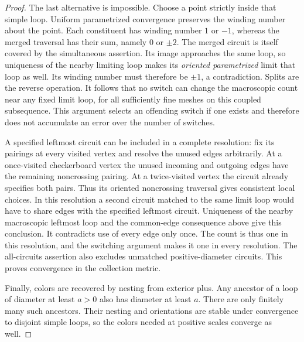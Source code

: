 \begin{proof}
The last alternative is impossible.  Choose a point strictly inside
that simple loop.  Uniform parametrized convergence preserves the
winding number about the point.  Each constituent has winding number
$1$ or $-1$, whereas the merged traversal has their sum, namely $0$ or
$\pm2$. The merged circuit is itself covered by the simultaneous
assertion. Its image approaches the same loop, so uniqueness of the
nearby limiting loop makes its \emph{oriented parametrized} limit that
loop as well. Its winding number must therefore be $\pm1$, a
contradiction. Splits
are the reverse operation.  It follows that no switch can change the
macroscopic count near any fixed limit loop, for all sufficiently fine
meshes on this coupled subsequence.  This argument selects an offending
switch if one exists and therefore does not accumulate an error over
the number of switches.

A specified leftmost circuit can be included in a complete resolution:
fix its pairings at every visited vertex and resolve the unused edges
arbitrarily. At a once-visited checkerboard vertex the unused incoming
and outgoing edges have the remaining noncrossing pairing. At a
twice-visited vertex the circuit already specifies both pairs. Thus its
oriented noncrossing traversal gives consistent local choices. In this
resolution a second circuit
matched to the same limit loop would have to share edges with the
specified leftmost circuit.  Uniqueness of the nearby macroscopic
leftmost loop and the common-edge consequence above give this
conclusion.  It contradicts use of every edge only once.  The count is
thus one in this resolution, and the switching argument makes it one
in every resolution.  The all-circuits assertion also excludes
unmatched positive-diameter circuits.  This proves convergence in the
collection metric.

Finally, colors are recovered by nesting from exterior plus.  Any
ancestor of a loop of diameter at least $a>0$ also has diameter at least
$a$.  There are only finitely many such ancestors.  Their nesting and
orientations are stable under convergence to disjoint simple loops,
so the colors needed at positive scales converge as well.
\end{proof}
